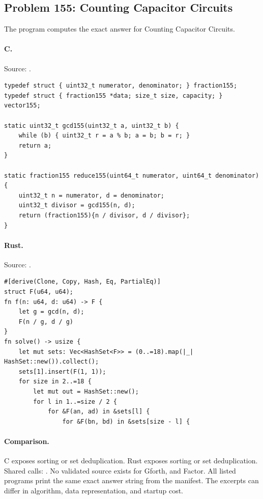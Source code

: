 \subsection{Problem 155: Counting Capacitor Circuits}
\label{walkthrough:p155}
The program computes the exact answer for Counting Capacitor Circuits.

\paragraph{C.} Source: .
\begin{lstlisting}
typedef struct { uint32_t numerator, denominator; } fraction155;
typedef struct { fraction155 *data; size_t size, capacity; } vector155;

static uint32_t gcd155(uint32_t a, uint32_t b) {
    while (b) { uint32_t r = a % b; a = b; b = r; }
    return a;
}

static fraction155 reduce155(uint64_t numerator, uint64_t denominator) {
    uint32_t n = numerator, d = denominator;
    uint32_t divisor = gcd155(n, d);
    return (fraction155){n / divisor, d / divisor};
}
\end{lstlisting}

\paragraph{Rust.} Source: .
\begin{lstlisting}
#[derive(Clone, Copy, Hash, Eq, PartialEq)]
struct F(u64, u64);
fn f(n: u64, d: u64) -> F {
    let g = gcd(n, d);
    F(n / g, d / g)
}
fn solve() -> usize {
    let mut sets: Vec<HashSet<F>> = (0..=18).map(|_| HashSet::new()).collect();
    sets[1].insert(F(1, 1));
    for size in 2..=18 {
        let mut out = HashSet::new();
        for l in 1..=size / 2 {
            for &F(an, ad) in &sets[l] {
                for &F(bn, bd) in &sets[size - l] {
\end{lstlisting}

\paragraph{Comparison.}
C exposes sorting or set deduplication. Rust exposes sorting or set deduplication. Shared calls: \texttt{}.
No validated source exists for Gforth, and Factor.
All listed programs print the same exact answer string from the manifest. The excerpts can differ in algorithm, data representation, and startup cost.


